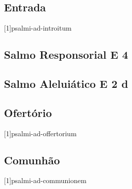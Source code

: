 
\subsection{Entrada}\label{subsection:missae-votivae/missa-votiva-de-spiritu-sancto/introitus}
[1]{psalmi-ad-introitum}

\AllowPageFlush

\subsection{Salmo Responsorial \textmd{E 4}}\label{subsection:missae-votivae/missa-votiva-de-spiritu-sancto/psalmus-responsorius}

\AllowPageFlush

\subsection{Salmo Aleluiático \textmd{E 2 d}}\label{subsection:missae-votivae/missa-votiva-de-spiritu-sancto/psalmus-alleluiaticus}

\AllowPageFlush

\subsection{Ofertório}\label{subsection:missae-votivae/missa-votiva-de-spiritu-sancto/offertorium}
[1]{psalmi-ad-offertorium}

\AllowPageFlush

\subsection{Comunhão}\label{subsection:missae-votivae/missa-votiva-de-spiritu-sancto/communio}
[1]{psalmi-ad-communionem}